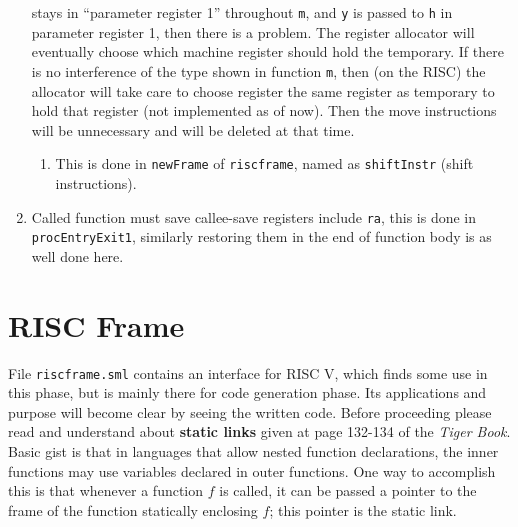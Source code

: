 \begin{enumerate}
  stays in ``parameter register 1'' throughout
  \texttt{m},
  and \texttt{y}
  is passed to
  \texttt{h} in
  parameter register 1, then there is a problem. The register allocator
  will eventually choose which machine register should hold the
  temporary. If there is no interference of the type shown in function
  \texttt{m},
  then (on the RISC) the allocator will take care to choose register the
  same register as temporary to hold that register (not implemented as of now). Then the move
  instructions will be unnecessary and will be deleted at that time.

  \begin{enumerate}
  \def\labelenumii{\arabic{enumii}.}
  \item
    This is done in
    \texttt{newFrame}
    of
    \texttt{riscframe},
    named as
    \texttt{shiftInstr}
    (shift instructions).
  \end{enumerate}
\item
  Called function must save callee-save registers include
  \texttt{ra},
  this is done in
  \texttt{procEntryExit1},
  similarly restoring them in the end of function body is as well done
  here.
\end{enumerate}

\section{RISC Frame}


File \texttt{riscframe.sml} contains an interface for RISC V, which finds some use in this phase, but is mainly there for code generation phase. Its applications and purpose will become clear by seeing the written code. Before proceeding please read and understand about \textbf{static links} given at page 132-134 of the \textit{Tiger Book}. Basic gist is that in languages that allow nested function declarations, the inner functions may use variables declared in outer functions. One way to accomplish this is that whenever a function $f$ is called, it can be passed a pointer to the frame of the function statically enclosing $f$; this pointer is the static link. 

